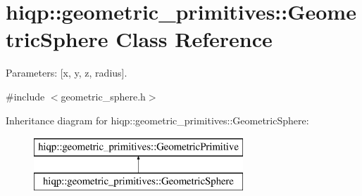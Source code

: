 \hypertarget{classhiqp_1_1geometric__primitives_1_1GeometricSphere}{\section{hiqp\-:\-:geometric\-\_\-primitives\-:\-:Geometric\-Sphere Class Reference}
\label{classhiqp_1_1geometric__primitives_1_1GeometricSphere}
}


Parameters\-: \mbox{[}x, y, z, radius\mbox{]}.  




{\ttfamily \#include $<$geometric\-\_\-sphere.\-h$>$}

Inheritance diagram for hiqp\-:\-:geometric\-\_\-primitives\-:\-:Geometric\-Sphere\-:\begin{figure}[H]
\begin{center}
\leavevmode
\includegraphics[height=2.000000cm]{classhiqp_1_1geometric__primitives_1_1GeometricSphere}
\end{center}
\end{figure}
